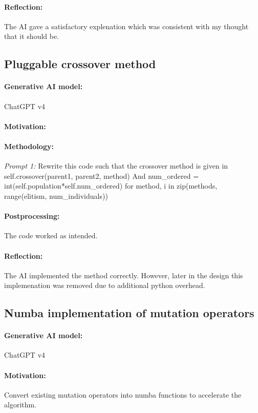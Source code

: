 \documentclass[a4paper,10pt]{article} %
\begin{document}
\paragraph{Reflection:} 
The AI gave a satisfactory explenation which was consistent with my thought that it should be.


\subsection{Pluggable crossover method} 
\paragraph{Generative AI model:} ChatGPT v4
\paragraph{Motivation:}
\paragraph{Methodology:} 
\textit{Prompt 1:}
Rewrite this code such that the crossover method is given in self.crossover(parent1, parent2, method) And num\_ordered = int(self.population*self.num\_ordered) for method, i in zip(methods, range(elitism, num\_individuals))

\paragraph{Postprocessing:} 
The code worked as intended.
\paragraph{Reflection:} 
The AI implemented the method correctly. However, later in the design this implemenation was removed due to additional python overhead.


\subsection{Numba implementation of mutation operators} 
\paragraph{Generative AI model:} ChatGPT v4
\paragraph{Motivation:}
Convert existing mutation operators into numba functions to accelerate the algorithm.
\end{document}
